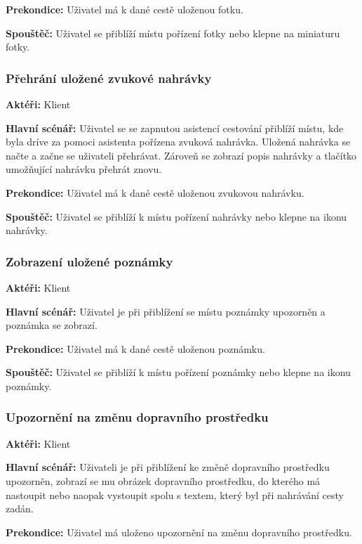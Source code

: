 \documentclass{article}
\newcommand{\usecase}[2]{\subsubsection{#1}\label{#2}}
\begin{document}
\vspace{0.1cm}
\noindent
\textbf{Prekondice:} Uživatel má k dané cestě uloženou fotku.

\vspace{0.1cm}
\noindent
\textbf{Spouštěč:} Uživatel se přiblíží místu pořízení fotky nebo klepne na miniaturu fotky.


\usecase{Přehrání uložené zvukové nahrávky}{prehraninahravky}
\textbf{Aktéři:} Klient

\vspace{0.1cm}
\noindent
\textbf{Hlavní scénář:} Uživatel se se zapnutou asistencí cestování přiblíží místu,
kde byla dríve za pomoci asistenta pořízena zvuková nahrávka. Uložená nahrávka se načte
a začne se uživateli přehrávat. Zároveň se zobrazí popis nahrávky a tlačítko umožňující
nahrávku přehrát znovu.

\vspace{0.1cm}
\noindent
\textbf{Prekondice:} Uživatel má k dané cestě uloženou zvukovou nahrávku.

\vspace{0.1cm}
\noindent
\textbf{Spouštěč:} Uživatel se přiblíží k místu pořízení nahrávky nebo klepne na ikonu nahrávky.

\usecase{Zobrazení uložené poznámky}{zobrazenipoznamky}
\textbf{Aktéři:} Klient

\vspace{0.1cm}
\noindent
\textbf{Hlavní scénář:} Uživatel je při přiblížení se místu poznámky upozorněn a poznámka se zobrazí.

\vspace{0.1cm}
\noindent
\textbf{Prekondice:} Uživatel má k dané cestě uloženou poznámku.

\vspace{0.1cm}
\noindent
\textbf{Spouštěč:} Uživatel se přiblíží k místu pořízení poznámky nebo klepne na ikonu poznámky.

\usecase{Upozornění na změnu dopravního prostředku}{upozorneniprostredek}
\textbf{Aktéři:} Klient

\vspace{0.1cm}
\noindent
\textbf{Hlavní scénář:} Uživateli je při přiblížení ke změně dopravního prostředku upozorněn,
zobrazí se mu obrázek dopravního prostředku, do kterého má nastoupit nebo naopak vystoupit spolu
s textem, který byl při nahrávání cesty zadán.

\vspace{0.1cm}
\noindent
\textbf{Prekondice:} Uživatel má uloženo upozornění na změnu dopravního prostředku.
\end{document}
